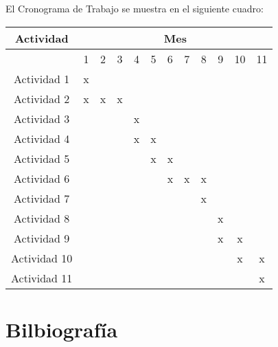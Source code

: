 \documentclass[10pt]{article}
\begin{document}
El Cronograma de Trabajo se muestra en el siguiente cuadro:

\begin{table}[!ht]
	\renewcommand{\arraystretch}{1.5}
	\label{tab:kurskew}
	\begin{center}
		\begin{tabular}{| c | c | c | c | c | c | c | c | c | c | c |c |}\cline{1-12}
			\multicolumn{1}{|c|}{Actividad} & \multicolumn{11}{|c|}{Mes}\\ \hline
			\multicolumn{1}{|c|}{ } &	\multicolumn{1}{|c|}{ 1} & 					\multicolumn{1}{|c|}{2} & \multicolumn{1}{|c|}{3} & 		\multicolumn{1}{|c|}{4} & \multicolumn{1}{|c|}{ 5} & 					\multicolumn{1}{|c|}{6} & \multicolumn{1}{|c|}{7} & 		\multicolumn{1}{|c|}{8} & \multicolumn{1}{|c|}{ 9} & 					\multicolumn{1}{|c|}{10} & \multicolumn{1}{|c|}{11} \\ \hline
			Actividad 1 & x & & & & & & & & & & \\ \hline
			Actividad 2 & x & x & x & & & & & & & & \\ \hline
			Actividad 3 & & & & x & & & & & & & \\ \hline
			Actividad 4 & & & & x & x & & & & & & \\ \hline
			Actividad 5 & & & & & x & x & & & & & \\ \hline
			Actividad 6 & & & & & & x & x & x & & & \\ \hline
			Actividad 7 & & & & & & & & x & & & \\ \hline
			Actividad 8 & & & & & & & & & x & & \\ \hline
			Actividad 9 & & & & & & & & & x & x & \\ \hline
			Actividad 10 & & & & & & & & & & x & x \\ \hline
			Actividad 11 & & & & & & & & & & & x \\ \hline
		\end{tabular}
	\end{center}
\end{table}

\pagebreak

\section{Bilbiografía}

\renewcommand\refname{}

\end{document}
